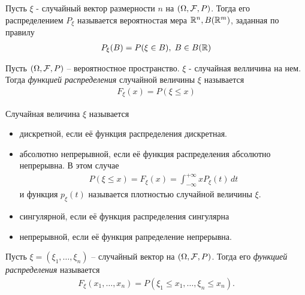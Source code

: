 \begin{definition}
  Пусть $\xi$ - случайный вектор размерности $n$ на $(\Omega, \mathcal{F}, P)$. 
  Тогда его распределением $P_\xi$ называется вероятностая мера $\mathbb{R}^n, B(\mathbb{R}^m)$, заданная по правилу
    \begin{align*}
      P_\xi (B) = P(\xi \in B),\; B \in B(\mathbb{R})
    \end{align*}
\end{definition}


\begin{definition}
  Пусть $(\Omega, \mathcal{F}, P)$ -- вероятностное пространство.
  $\xi$ - случайная велличина на нем. Тогда \emph{функцией распределения} случайной величины $\xi$ называется
    \begin{align*}
      F_\xi (x) = P(\xi \leq x)
    \end{align*}
\end{definition}

\begin{definition}
  Случайная величина $\xi$ называется
  \begin{itemize}
    \item 
      дискретной, если её функция распределения дискретная.

    \item 
      абсолютно непрерывной, если её функция распределения абсолютно непрерывна. 
      В этом случае
      \begin{align*}
        P(\xi \leq x) = F_\xi (x) = \int_{-\infty}^{+\infty}{x} P_\xi (t)\, dt
      \end{align*}
      и функция $p_\xi (t)$ называется плотностью случайной величины $\xi$.\\

    \item
      сингулярной, если её функция распределения сингулярна

    \item
      непрерывной, если её функция рапределение непрерывна.
  \end{itemize}
\end{definition}

\begin{definition}
  Пусть $\xi = (\xi_1, \ldots, \xi_n)$ -- случайный вектор на $(\Omega, \mathcal{F}, P)$. 
  Тогда его \emph{функцией распределения} называется 
  \begin{align*}
    F_\xi (x_1, \ldots, x_n) = P(\xi_1 \leq x_1, \ldots, \xi_n \leq x_n).
  \end{align*}
\end{definition}

